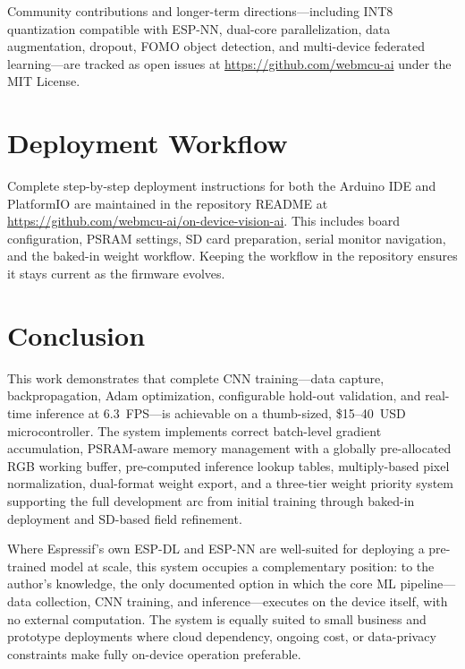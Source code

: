 \documentclass[12pt]{article}
\begin{document}
Community contributions and longer-term directions---including INT8 quantization
compatible with ESP-NN, dual-core parallelization, data augmentation, dropout,
FOMO object detection, and multi-device federated learning---are tracked as open
issues at \url{https://github.com/webmcu-ai} under the MIT License.

\section{Deployment Workflow}
\label{sec:deployment}

Complete step-by-step deployment instructions for both the Arduino IDE and
PlatformIO are maintained in the repository README at
\url{https://github.com/webmcu-ai/on-device-vision-ai}.
This includes board configuration, PSRAM settings, SD card preparation, serial
monitor navigation, and the baked-in weight workflow.
Keeping the workflow in the repository ensures it stays current as the firmware
evolves.

\section{Conclusion}
\label{sec:conclusion}

This work demonstrates that complete CNN training---data capture,
backpropagation, Adam optimization, configurable hold-out validation, and
real-time inference at 6.3~FPS---is achievable on a thumb-sized,
\$15--40~USD microcontroller.
The system implements correct batch-level gradient accumulation, PSRAM-aware
memory management with a globally pre-allocated RGB working buffer,
pre-computed inference lookup tables, multiply-based pixel normalization,
dual-format weight export, and a three-tier weight priority system supporting
the full development arc from initial training through baked-in deployment and
SD-based field refinement.

Where Espressif's own ESP-DL and ESP-NN are well-suited for deploying
a pre-trained model at scale, this system occupies a complementary position:
to the author's knowledge, the only documented option in which the core ML
pipeline---data collection, CNN training, and inference---executes on the
device itself, with no external computation.
The system is equally suited to small business and prototype deployments where
cloud dependency, ongoing cost, or data-privacy constraints make fully on-device
operation preferable.
\end{document}
